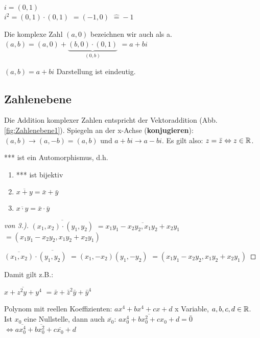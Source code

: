\renewcommand{\ldate}{2015-11-20}

\begin{defi}
$i=(0,1)$\\
$i^2 = (0,1)\cdot (0,1)$
$=(-1,0)$
$\widehat{=} -1$

Die komplexe Zahl $(a,0)$ bezeichnen wir auch als a. 
$(a,b)=(a,0)+\underbrace{(b,0)\cdot (0,1)}_{(0,b)}$
$=a+bi$

$(a,b)=a+bi$ Darstellung ist eindeutig. 
\end{defi}

\subsection{Zahlenebene}
Die Addition komplexer Zahlen entspricht der Vektoraddition (Abb. \ref{fig:Zahlenebene1}). Spiegeln an der x-Achse (\textbf{konjugieren}): 
$(a,b) \rightarrow (a,-b) =(a,b)$ und $a+bi \rightarrow a-bi$. Es gilt also: $z=\bar z \Leftrightarrow z\in \mathbb{R}$.

*** ist ein Automorphismus, d.h. 
\begin{enumerate}
\item *** ist bijektiv
\item $\overline{x+y} = \bar x + \bar y$
\item $\overline{x\cdot y} = \bar x \cdot  \bar y$
\end{enumerate}

\begin{proof}[von 3.)]
$\overline{(x_1,x_2) \cdot (y_1,y_2)}$
$=\overline{x_1 y_1 - x_2 y_2, x_1 y_2+x_2 y_1}$
$=(x_1 y_1 - x_2 y_2, x_1 y_2+x_2 y_1)$

$\overline{(x_1,x_2)} \cdot \overline{(y_1,y_2)}$
$=(x_1,-x_2)(y_1,-y_2)$
$=(x_1 y_1 - x_2 y_2, x_1 y_2+x_2 y_1)$
\end{proof}

Damit gilt z.B.:

$\overline{x+z^2 y + y^4} $
$=\bar x + \bar z^2 \bar y + \bar y^4$

Polynom mit reellen Koeffizienten: $ax^4 + bx^4 + cx + d$ x Variable, $a,b,c,d\in \mathbb{R}$. Ist $x_0$ eine Nullstelle, dann auch $\overline{x_0}$: 
$\overline{a x_0^4 + b x_0^2 + c x_0 + d} = \bar 0$
$\Leftrightarrow a \overline{x_0^4} + b \overline{x_0^2} + c \overline{x_0} + d$

